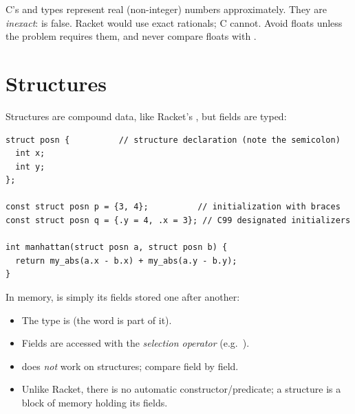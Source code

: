 C's  and  types represent real (non-integer) numbers
approximately. They are \emph{inexact}:  is false. Racket would use exact
rationals; C cannot. Avoid floats unless the problem requires them, and never compare floats
with \code{==}.

\section{Structures}

Structures are compound data, like Racket's , but fields are typed:
\begin{lstlisting}[style=c]
struct posn {          // structure declaration (note the semicolon)
  int x;
  int y;
};

const struct posn p = {3, 4};          // initialization with braces
const struct posn q = {.y = 4, .x = 3}; // C99 designated initializers

int manhattan(struct posn a, struct posn b) {
  return my_abs(a.x - b.x) + my_abs(a.y - b.y);
}
\end{lstlisting}
In memory,  is simply its fields stored one after another:

\begin{center}
\end{center}
\begin{itemize}
  \item The type is  (the word  is part of it).
  \item Fields are accessed with the \emph{selection operator}  (e.g.\ ).
  \item \code{==} does \emph{not} work on structures; compare field by field.
  \item Unlike Racket, there is no automatic constructor/predicate; a structure is a block of
    memory holding its fields.
\end{itemize}

